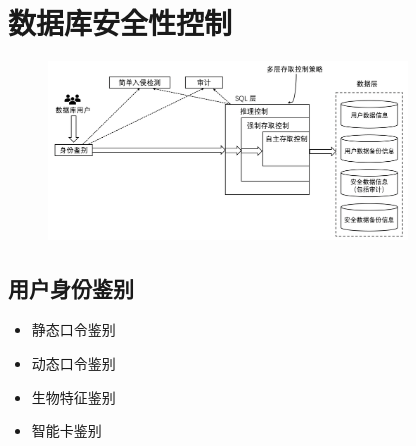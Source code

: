 \section{数据库安全性控制}
\begin{figure}[H]
    \vspace{-0.5em}
	\centering
	\includegraphics[width=0.85\textwidth]{images/4.2}
    \vspace{-1em}
\end{figure}

\subsection{用户身份鉴别}
\vspace{-0.8em}
\begin{multicols}{4}
    \begin{itemize}
        \item 静态口令鉴别
        \item 动态口令鉴别
        \item 生物特征鉴别
        \item 智能卡鉴别
    \end{itemize}
\end{multicols}
\vspace{-1em}

